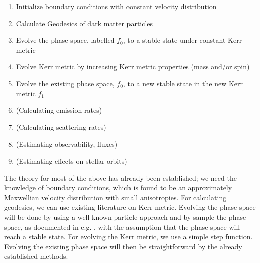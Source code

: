 \documentclass[12pt]{article}
\begin{document}
\begin{enumerate}
 \item Initialize boundary conditions with constant velocity distribution
 \item Calculate Geodesics of dark matter particles
 \item Evolve the phase space, labelled $f_0$, to a stable state under constant Kerr metric %
 \item Evolve Kerr metric by increasing Kerr metric properties (mass and/or spin)
 \item Evolve the existing phase space, $f_0$, to a new stable state in the new Kerr metric $f_1$
 \item (Calculating emission rates) %
 \item (Calculating scattering rates) %
 \item (Estimating observability, fluxes) %
 \item (Estimating effects on stellar orbits) %
\end{enumerate}

The theory for most of the above has already been established; 
we need the knowledge of boundary conditions, which is found to be 
an approximately Maxwellian velocity distribution \citep{dm_halo_maxwellian} with small anisotropies. 
For calculating geodesics, we can use 
existing literature on Kerr metric. Evolving the 
phase space will be done by using a well-known particle approach and by sample the phase space, 
as documented in e.g. 
\citep{kuhlen2012numerical,schnittman2015}, with the assumption that the phase space will 
reach a stable state. For evolving the Kerr metric, we use a simple step function. Evolving 
the existing phase space will then be straightforward by the already established methods.
\end{document}
